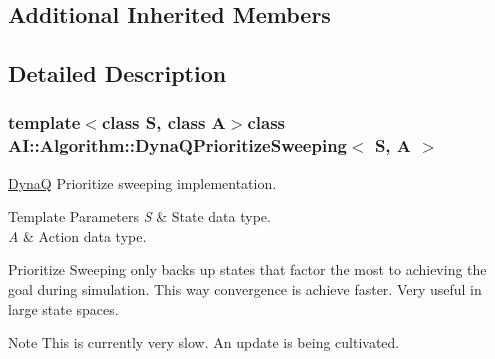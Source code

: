 \subsection*{Additional Inherited Members}


\subsection{Detailed Description}
\subsubsection*{template$<$class S, class A$>$class A\-I\-::\-Algorithm\-::\-Dyna\-Q\-Prioritize\-Sweeping$<$ S, A $>$}

\hyperlink{classAI_1_1Algorithm_1_1DynaQ}{Dyna\-Q} Prioritize sweeping implementation. 


\begin{DoxyTemplParams}{Template Parameters}
{\em S} & State data type. \\
\hline
{\em A} & Action data type.\\
\hline
\end{DoxyTemplParams}
Prioritize Sweeping only backs up states that factor the most to achieving the goal during simulation. This way convergence is achieve faster. Very useful in large state spaces.

\begin{DoxyNote}{Note}
This is currently very slow. An update is being cultivated. 
\end{DoxyNote}


